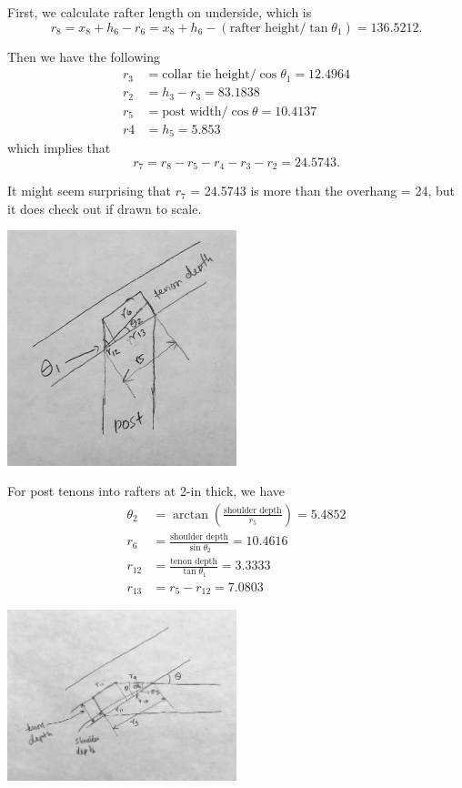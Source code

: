 \documentclass{article}\usepackage[]{graphicx}\usepackage[]{xcolor}
\begin{document}
First, we calculate rafter length on underside, which is 
\[ r_8 = x_8 + h_6 - r_6 = x_8 + h_6 - (\text{rafter height}/\tan\theta_1) = 136.5212. \]

Then we have the following
\begin{align*}
r_3 &= \text{collar tie height}/\cos\theta_1 = 12.4964\\
r_2 &= h_3 - r_3 = 83.1838\\
r_5 &= \text{post width}/\cos\theta = 10.4137\\
r4 &= h_5 = 5.853
\end{align*}
which implies that 
\[ r_7 = r_8 - r_5 - r_4 - r_3 - r_2 = 24.5743. \]

It might seem surprising that $r_7$ = 24.5743 is more than the overhang = 24, but it does check out if drawn to scale. 

\begin{center}
	\includegraphics[width=0.5\textwidth]{images/post_tenons_into_rafters}
\end{center}

For post tenons into rafters at 2-in thick, we have 
\begin{align*}
  \theta_2 &= \arctan \left(\frac{\text{shoulder depth}}{r_5}\right) = 5.4852\\
  r_6 &= \frac{\text{shoulder depth}}{\sin\theta_2} = 10.4616\\
  r_{12} &= \frac{\text{tenon depth}}{\tan\theta_1} = 3.3333\\
  r_{13} &= r_5 - r_{12} = 7.0803
\end{align*}

\begin{center}
	\includegraphics[width=0.5\textwidth]{images/collar_tie_tenons_into_rafters}
\end{center}
\end{document}
